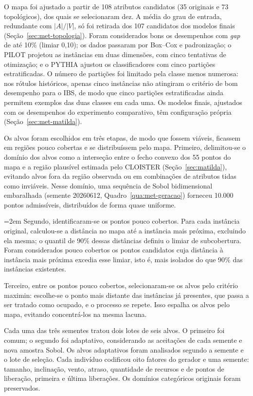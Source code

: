 O mapa foi ajustado a partir de 108 atributos candidatos (35 originais e 73
topológicos), dos quais se selecionaram dez. A média do grau de entrada,
redundante com $|A|/|V|$, só foi retirada dos 107 candidatos dos modelos
finais (Seção~\ref{sec:met-topologia}). Foram considerados bons os
desempenhos com \textit{gap} de até 10\% (limiar 0,10); os dados passaram por
Box--Cox e padronização; o PILOT projetou as instâncias em duas dimensões,
com cinco tentativas de otimização; e o PYTHIA ajustou os classificadores
com cinco partições estratificadas. O número de partições foi limitado pela
classe menos numerosa: nos rótulos históricos, apenas cinco instâncias não
atingiram o critério de bom desempenho para o IBS, de modo que cinco
partições estratificadas ainda permitem exemplos das duas classes em cada
uma. Os modelos finais, ajustados com os desempenhos do experimento
comparativo, têm configuração própria (Seção~\ref{sec:met-matilda}).

Os alvos foram escolhidos em três etapas, de modo que fossem viáveis,
ficassem em regiões pouco cobertas e se distribuíssem pelo mapa. Primeiro,
delimitou-se o domínio dos alvos como a interseção entre o fecho convexo dos
55 pontos do mapa e a região plausível estimada pelo CLOISTER
(Seção~\ref{sec:matilda}), evitando alvos fora da região observada ou em
combinações de atributos tidas como inviáveis. Nesse domínio, uma sequência
de Sobol bidimensional embaralhada (semente 20260612,
Quadro~\ref{qua:met-geracao}) forneceu 10.000 pontos admissíveis,
distribuídos de forma quase uniforme.

{\emergencystretch=2em\relax
Segundo, identificaram-se os pontos pouco cobertos. Para cada instância
original, calculou-se a distância no mapa até a instância mais próxima,
excluindo ela mesma; o quantil de 90\% dessas distâncias definiu o limiar de
subcobertura. Foram considerados pouco cobertos os pontos candidatos cuja
distância à instância mais próxima excedia esse limiar, isto é, mais isolados
do que 90\% das instâncias existentes.\par}

Terceiro, entre os pontos pouco cobertos, selecionaram-se os alvos pelo
critério maximin: escolhe-se o ponto mais distante das instâncias já
presentes, que passa a ser tratado como ocupado, e o processo se repete.
Isso espalha os alvos pelo mapa, evitando concentrá-los na mesma lacuna.

Cada uma das três sementes tratou dois lotes de seis alvos. O primeiro
foi comum; o segundo foi adaptativo, considerando as aceitações de cada
semente e nova amostra Sobol. Os alvos adaptativos foram analisados
segundo a semente e o lote de seleção. Cada indivíduo codificou
oito fatores do gerador e uma semente: tamanho, inclinação, vento, atraso,
quantidade de recursos e de pontos de liberação, primeira e última
liberações. Os domínios categóricos originais foram preservados.

